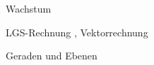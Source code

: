 


\begin{inhalt}
	\item Wachstum
	\item LGS-Rechnung , Vektorrechnung 
	\item Geraden und Ebenen 
\end{inhalt}




